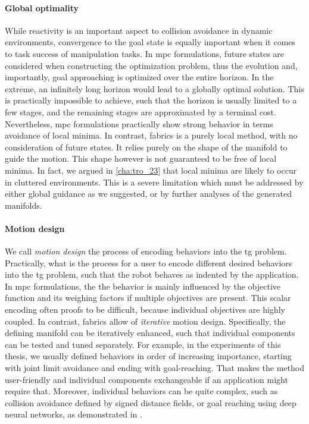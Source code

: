 \paragraph{Global optimality}
\label{par:discussion_global_optimiality}

While reactivity is an important aspect to collision
avoidance in dynamic environments, convergence to the goal
state is equally important when it comes to task success of
manipulation tasks. In \ac{mpc} formulations, future states
are considered when constructing the optimization problem,
thus the evolution and, importantly, goal approaching is
optimized over the entire horizon. In the extreme, an
infinitely long horizon would lead to a globally optimal
solution. This is practically impossible to achieve, such
that the horizon is usually limited to a few stages, and the
remaining stages are approximated by a terminal cost.
Nevertheless, \ac{mpc} formulations practically show strong 
behavior in terms avoidance of local minima. In contrast,
\ac{fabrics} is a purely local method, with no consideration
of future states. It relies purely on the shape of the
manifold to guide the motion. This shape however is not
guaranteed to be free of local minima. In fact, we argued in 
\cref{cha:tro_23} that local minima are likely to occur in
cluttered environments. This is a severe limitation which
must be addressed by either global guidance as we suggested,
or by further analyses of the generated manifolds.

\paragraph{Motion design}
\label{par:motion_design}

We call \textit{motion design} the process of encoding
behaviors into the \ac{tg} problem. Practically, what is the
process for a user to encode different desired behaviors
into the \ac{tg} problem, such that the robot behaves as
indented by the application. In \ac{mpc} formulations, the 
the behavior is mainly influenced by the objective function
and its weighing factors if multiple objectives are present.
This scalar encoding often proofs to be difficult, because
individual objectives are highly coupled. In contrast,
\ac{fabrics} allow of \textit{iterative} motion design.
Specifically, the defining manifold can be iteratively
enhanced, such that individual components can be tested and
tuned separately. For example, in the experiments of this
thesis, we usually defined behaviors in order of
increasing importance, starting with joint limit avoidance
and ending with goal-reaching. That makes the method
user-friendly and individual components exchangeable if an
application might require that. Moreover, individual
behaviors can be quite complex, such as collision avoidance
defined by signed distance fields, or goal reaching using
deep neural networks, as demonstrated in \cite{xie2023neural}.

